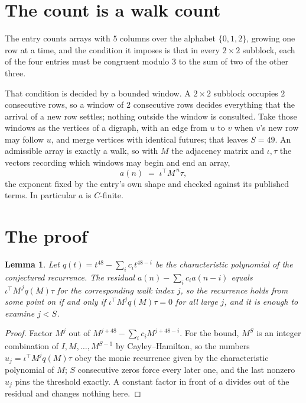 \documentclass[11pt,a4paper]{article}
\theoremstyle{plain}
\newtheorem{lemma}[theorem]{Lemma}
\theoremstyle{definition}
\begin{document}
\section{The count is a walk count}

The entry counts arrays with $5$ columns over the alphabet $\{0,1,2\}$, growing one row at a time, and the condition it imposes is that in every $2\times2$ subblock, each of the four entries must be congruent modulo $3$ to the sum of two of the other three.

That condition is decided by a bounded window. A $2\times2$ subblock occupies $2$ consecutive rows, so a window of $2$ consecutive rows decides everything that the arrival of a new row settles; nothing outside the window is consulted. Take those windows as the vertices of a digraph, with an edge from $u$ to $v$ when $v$'s new row may follow $u$, and merge vertices with identical futures; that leaves $S=49$. An admissible array is exactly a walk, so with $M$ the adjacency matrix and $\iota,\tau$ the vectors recording which windows may begin and end an array,
\[
a(n)\;=\;\iota^{\!\top}M^{\,n}\tau ,
\]
the exponent fixed by the entry's own shape and checked against its published terms. In
particular $a$ is $C$-finite.

\section{The proof}

\begin{lemma}\label{lem:crit}
Let $q(t)=t^{48}-\sum_i c_it^{48-i}$ be the characteristic polynomial of the
conjectured recurrence. The residual $a(n)-\sum_ic_ia(n-i)$ equals
$\iota^{\!\top}M^{\,j}q(M)\tau$ for the corresponding walk index $j$, so the recurrence
holds from some point on if and only if $\iota^{\!\top}M^{j}q(M)\tau=0$ for all large $j$,
and it is enough to examine $j<S$.
\end{lemma}

\begin{proof}
Factor $M^{j}$ out of $M^{j+48}-\sum_ic_iM^{j+48-i}$. For the bound, $M^{S}$
is an integer combination of $I,M,\dots,M^{S-1}$ by Cayley--Hamilton, so the numbers
$u_j=\iota^{\!\top}M^{j}q(M)\tau$ obey the monic recurrence given by the characteristic
polynomial of $M$; $S$ consecutive zeros force every later one, and the last nonzero $u_j$
pins the threshold exactly. A constant factor in front of $a$ divides out of the residual and
changes nothing here.
\end{proof}
\end{document}
